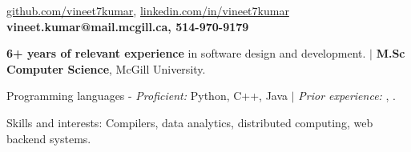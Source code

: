 \documentclass{resume} %
\begin{document}
\begin{hSubsection}
{
    \href{https://github.com/vineet7kumar}{github.com/vineet7kumar},
    \href{https://linkedin.com/in/vineet7kumar}{linkedin.com/in/vineet7kumar}
}
{
    \textbf{vineet.kumar@mail.mcgill.ca, 514-970-9179}
}
{%
}
\end{hSubsection}



\smallskip \smallskip 
\begin{rSection}{} \smallskip 
\begin{lSubsection} 
\item \textbf{6+ years of relevant experience} in software design and
        development. $\vert$ \textbf{M.Sc Computer Science}, McGill University. 
\item Programming languages - \emph{Proficient:} Python, C++, Java
        $\vert$ \emph{Prior experience:} \xtenx, \matlabx.
\item Skills and interests: Compilers, data analytics,
        distributed computing, web backend systems.
\end{lSubsection}
\end{rSection}
\end{document}
